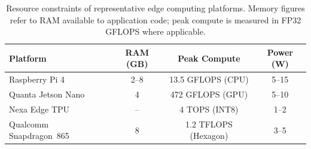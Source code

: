 \begin{table}[htbp]
\centering
\caption{Resource constraints of representative edge computing platforms.
Memory figures refer to RAM available to application code; peak compute
is measured in FP32 GFLOPS where applicable.}
\label{tab:devices}
\begin{tabular}{@{}lccc@{}}
\toprule
\textbf{Platform} & \textbf{RAM (GB)} & \textbf{Peak Compute} & \textbf{Power (W)} \\
\midrule
Raspberry Pi 4        & 2--8  & 13.5 GFLOPS (CPU)      & 5--15  \\
Quanta Jetson Nano    & 4     & 472 GFLOPS (GPU)       & 5--10  \\
Nexa Edge TPU       & --    & 4 TOPS (INT8)          & 1--2   \\
Qualcomm Snapdragon~865 & 8  & 1.2 TFLOPS (Hexagon)   & 3--5   \\
\bottomrule
\end{tabular}
\end{table}

\newpage

